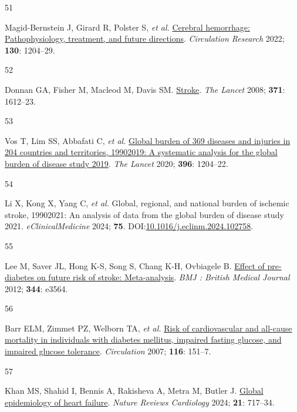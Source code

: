 \documentclass[
  a4paper,
  headsepline=true,
  open=any]{scrbook}
\newlength{\cslhangindent}
\newlength{\csllabelwidth}
\newlength{\cslentryspacingunit} %
\newenvironment{CSLReferences}[2] %
 {%
  \setlength{\parindent}{0pt}
  \ifodd #1
  \let\oldpar\par
  \def\par{\hangindent=\cslhangindent\oldpar}
  \fi
  \setlength{\parskip}{#2\cslentryspacingunit}
 }%
 {}
\newcommand{\CSLLeftMargin}[1]{\parbox[t]{\csllabelwidth}{#1}}
\newcommand{\CSLRightInline}[1]{\parbox[t]{\linewidth - \csllabelwidth}{#1}\break}
\begin{document}
\begin{CSLReferences}{0}{0}
\leavevmode{}%
\CSLLeftMargin{51 }%
\CSLRightInline{Magid-Bernstein J, Girard R, Polster S, \emph{et al.}
\href{https://doi.org/10.1161/CIRCRESAHA.121.319949}{Cerebral
hemorrhage: Pathophysiology, treatment, and future directions}.
\emph{Circulation Research} 2022; \textbf{130}: 1204--29.}

\leavevmode{}%
\CSLLeftMargin{52 }%
\CSLRightInline{Donnan GA, Fisher M, Macleod M, Davis SM.
\href{https://doi.org/10.1016/S0140-6736(08)60694-7}{Stroke}. \emph{The
Lancet} 2008; \textbf{371}: 1612--23.}

\leavevmode{}%
\CSLLeftMargin{53 }%
\CSLRightInline{Vos T, Lim SS, Abbafati C, \emph{et al.}
\href{https://doi.org/10.1016/S0140-6736(20)30925-9}{Global burden of
369 diseases and injuries in 204 countries and territories,
1990{\textendash}2019: A systematic analysis for the global burden of
disease study 2019}. \emph{The Lancet} 2020; \textbf{396}: 1204--22.}

\leavevmode{}%
\CSLLeftMargin{54 }%
\CSLRightInline{Li X, Kong X, Yang C, \emph{et al.} Global, regional,
and national burden of ischemic stroke, 1990{\textendash}2021: An
analysis of data from the global burden of disease study 2021.
\emph{eClinicalMedicine} 2024; \textbf{75}.
DOI:\href{https://doi.org/10.1016/j.eclinm.2024.102758}{10.1016/j.eclinm.2024.102758}.}

\leavevmode{}%
\CSLLeftMargin{55 }%
\CSLRightInline{Lee M, Saver JL, Hong K-S, Song S, Chang K-H, Ovbiagele
B. \href{https://doi.org/10.1136/bmj.e3564}{Effect of pre-diabetes on
future risk of stroke: Meta-analysis}. \emph{BMJ : British Medical
Journal} 2012; \textbf{344}: e3564.}

\leavevmode{}%
\CSLLeftMargin{56 }%
\CSLRightInline{Barr ELM, Zimmet PZ, Welborn TA, \emph{et al.}
\href{https://doi.org/10.1161/CIRCULATIONAHA.106.685628}{Risk of
cardiovascular and all-cause mortality in individuals with diabetes
mellitus, impaired fasting glucose, and impaired glucose tolerance}.
\emph{Circulation} 2007; \textbf{116}: 151--7.}

\leavevmode{}%
\CSLLeftMargin{57 }%
\CSLRightInline{Khan MS, Shahid I, Bennis A, Rakisheva A, Metra M,
Butler J. \href{https://doi.org/10.1038/s41569-024-01046-6}{Global
epidemiology of heart failure}. \emph{Nature Reviews Cardiology} 2024;
\textbf{21}: 717--34.}


\end{CSLReferences}
\end{document}
